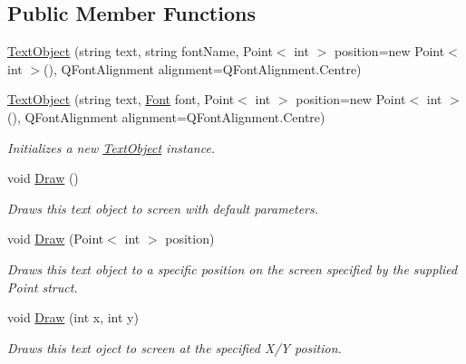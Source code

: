 \subsection*{Public Member Functions}
\begin{DoxyCompactItemize}
\item 
\hyperlink{class_tri_devs_1_1_tri_engine_1_1_text_1_1_text_object_a75d145b0a63b4cfba96c6e546932730a}{Text\-Object} (string text, string font\-Name, Point$<$ int $>$ position=new Point$<$ int $>$(), Q\-Font\-Alignment alignment=Q\-Font\-Alignment.\-Centre)
\item 
\hyperlink{class_tri_devs_1_1_tri_engine_1_1_text_1_1_text_object_acfbfc0b2b8ea2d28ea1c9cf15a187643}{Text\-Object} (string text, \hyperlink{class_tri_devs_1_1_tri_engine_1_1_text_1_1_font}{Font} font, Point$<$ int $>$ position=new Point$<$ int $>$(), Q\-Font\-Alignment alignment=Q\-Font\-Alignment.\-Centre)
\begin{DoxyCompactList}\small\item\em Initializes a new \hyperlink{class_tri_devs_1_1_tri_engine_1_1_text_1_1_text_object}{Text\-Object} instance. \end{DoxyCompactList}\item 
void \hyperlink{class_tri_devs_1_1_tri_engine_1_1_text_1_1_text_object_af7f35c49514fb7a6b8a92d56f2919c79}{Draw} ()
\begin{DoxyCompactList}\small\item\em Draws this text object to screen with default parameters. \end{DoxyCompactList}\item 
void \hyperlink{class_tri_devs_1_1_tri_engine_1_1_text_1_1_text_object_aadfe21bb65b6f55b47062777a8178994}{Draw} (Point$<$ int $>$ position)
\begin{DoxyCompactList}\small\item\em Draws this text object to a specific position on the screen specified by the supplied Point struct. \end{DoxyCompactList}\item 
void \hyperlink{class_tri_devs_1_1_tri_engine_1_1_text_1_1_text_object_af36bac67ca19ddbd9a6a5d01841b5c8d}{Draw} (int x, int y)
\begin{DoxyCompactList}\small\item\em Draws this text oject to screen at the specified X/\-Y position. \end{DoxyCompactList}\end{DoxyCompactItemize}
